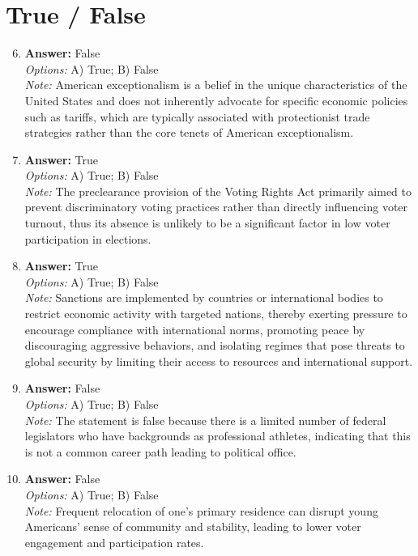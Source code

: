 \documentclass[12pt]{article}
\begin{document}
\section*{True / False}
\begin{enumerate}[label=\arabic*.]
\setcounter{enumi}{5}
\item \textbf{Answer:} False
\\ \textit{Options:} A) True; B) False
\\ \textit{Note:} American exceptionalism is a belief in the unique characteristics of the United States and does not inherently advocate for specific economic policies such as tariffs, which are typically associated with protectionist trade strategies rather than the core tenets of American exceptionalism.
\item \textbf{Answer:} True
\\ \textit{Options:} A) True; B) False
\\ \textit{Note:} The preclearance provision of the Voting Rights Act primarily aimed to prevent discriminatory voting practices rather than directly influencing voter turnout, thus its absence is unlikely to be a significant factor in low voter participation in elections.
\item \textbf{Answer:} True
\\ \textit{Options:} A) True; B) False
\\ \textit{Note:} Sanctions are implemented by countries or international bodies to restrict economic activity with targeted nations, thereby exerting pressure to encourage compliance with international norms, promoting peace by discouraging aggressive behaviors, and isolating regimes that pose threats to global security by limiting their access to resources and international support.
\item \textbf{Answer:} False
\\ \textit{Options:} A) True; B) False
\\ \textit{Note:} The statement is false because there is a limited number of federal legislators who have backgrounds as professional athletes, indicating that this is not a common career path leading to political office.
\item \textbf{Answer:} False
\\ \textit{Options:} A) True; B) False
\\ \textit{Note:} Frequent relocation of one's primary residence can disrupt young Americans' sense of community and stability, leading to lower voter engagement and participation rates.
\end{enumerate}
\end{document}
